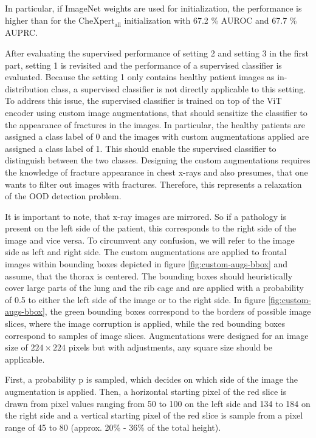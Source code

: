 In particular, if ImageNet weights are used for initialization, the performance is higher than for the $\text{CheXpert}_\text{all}$ initialization with 67.2 \% AUROC and 67.7 \% AUPRC.
\par
After evaluating the supervised performance of setting 2 and setting 3 in the first part, setting 1 is revisited and the performance of a supervised classifier is evaluated.
Because the setting 1 only contains healthy patient images as in-distribution class, a supervised classifier is not directly applicable to this setting.
To address this issue, the supervised classifier is trained on top of the ViT encoder using custom image augmentations, that should sensitize the classifier to the appearance of fractures in the images.
In particular, the healthy patients are assigned a class label of 0 and the images with custom augmentations applied are assigned a class label of 1.
This should enable the supervised classifier to distinguish between the two classes.
Designing the custom augmentations requires the knowledge of fracture appearance in chest x-rays and also presumes, that one wants to filter out images with fractures.
Therefore, this represents a relaxation of the OOD detection problem.
\par
It is important to note, that x-ray images are mirrored.
So if a pathology is present on the left side of the patient, this corresponds to the right side of the image and vice versa.
To circumvent any confusion, we will refer to the image side as left and right side.
The custom augmentations are applied to frontal images within bounding boxes depicted in figure \ref{fig:custom-augs-bbox} and assume, that the thorax is centered.
The bounding boxes should heuristically cover large parts of the lung and the rib cage and are applied with a probability of 0.5 to either the left side of the image or to the right side.
In figure \ref{fig:custom-augs-bbox}, the green bounding boxes correspond to the borders of possible image slices, where the image corruption is applied, while the red bounding boxes correspond to samples of image slices.
Augmentations were designed for an image size of $224\times224$ pixels but with adjustments, any square size should be applicable.
\par
First, a probability p is sampled, which decides on which side of the image the augmentation is applied.
Then, a horizontal starting pixel of the red slice is drawn from pixel values ranging from 50 to 100 on the left side and 134 to 184 on the right side and a vertical starting pixel of the red slice is sample from a pixel range of 45 to 80 (approx. 20\% - 36\% of the total height).
